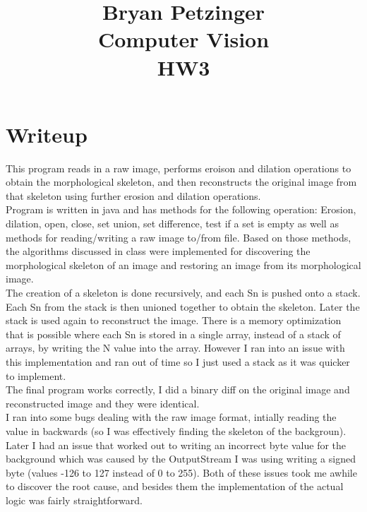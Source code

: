 \documentclass{article}
\begin{document}
\title{
Bryan Petzinger \\
Computer Vision \\
HW3 \\
}
\maketitle

\section{Writeup}
This program reads in a raw image, performs eroison and dilation operations to obtain the morphological skeleton, and then reconstructs the original image from that skeleton using further erosion and dilation operations. \\

Program is written in java and has methods for the following operation: Erosion, dilation, open, close, set union, set difference, test if a set is empty as well as methods for reading/writing a raw image to/from file. Based on those methods, the algorithms discussed in class were implemented for discovering the morphological skeleton of an image and restoring an image from its morphological image. \\

The creation of a skeleton is done recursively, and each Sn is pushed onto a stack. Each Sn from the stack is then unioned together to obtain the skeleton. Later the stack is used again to reconstruct the image. There is a memory optimization that is possible where each Sn is stored in a single array, instead of a stack of arrays, by writing the N value into the array. However I ran into an issue with this implementation and ran out of time so I just used a stack as it was quicker to implement. \\

The final program works correctly, I did a binary diff on the original image and reconstructed image and they were identical. \\

I ran into some bugs dealing with the raw image format, intially reading the value in backwards (so I was effectively finding the skeleton of the backgroun). Later I had an issue that worked out to writing an incorrect byte value for the background which was caused by the OutputStream I was using writing a signed byte (values -126 to 127 instead of 0 to 255). Both of these issues took me awhile to discover the root cause, and besides them the implementation of the actual logic was fairly straightforward. \\
\end{document}
